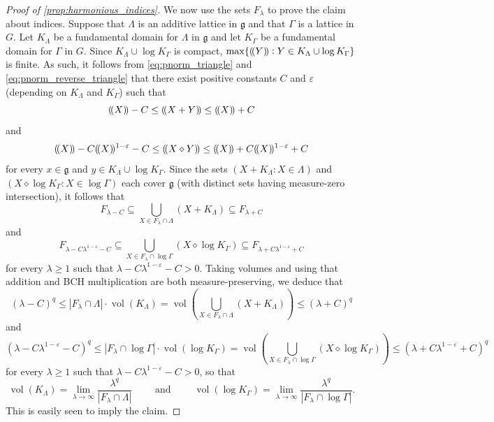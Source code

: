 \documentclass[11pt]{article}
\numberwithin{equation}{section}
\theoremstyle{plain}
\theoremstyle{definition}
\theoremstyle{remark}
\numberwithin{equation}{section}
\newcommand{\eps}{\varepsilon}
\newcommand{\Vol}{\operatorname{vol}}
\numberwithin{equation}{section}
\DeclarePairedDelimiter\pnorm{(\!(}{)\!)}
\begin{document}
\begin{proof}[Proof of \cref{prop:harmonious_indices}]
We now use the sets $F_\lambda$ to prove the claim about indices. Suppose that $\Lambda$ is an additive lattice in $\mathfrak{g}$ and that $\Gamma$ is a lattice in $G$. Let $K_\Lambda$ be a fundamental domain for $\Lambda$ in $\mathfrak{g}$ and let $K_\Gamma$ be a fundamental domain for $\Gamma$ in $G$. 
%
 Since $K_\Lambda \cup \log K_\Gamma$ is compact, $\max\{\pnorm{Y}:Y\in K_\Lambda \cup \log K_\Gamma\}$ is finite. As such, it follows from \eqref{eq:pnorm_triangle} and \eqref{eq:pnorm_reverse_triangle} that there exist positive constants $C$ and $\eps$ (depending on $K_\Lambda$ and $K_\Gamma$) such that
\[
\pnorm{X}-C \leq \pnorm{X+Y} \leq \pnorm{X} + C
 \]
 and
 \[
 \pnorm{X}-C\pnorm{X}^
{1-\eps} -C \leq \pnorm{X 
\diamond Y} \leq \pnorm{X} + C \pnorm{X}^
{1-\eps}+C
\]
for every $x\in \mathfrak{g}$ and $y\in K_\Lambda \cup \log K_\Gamma$. %
Since the sets $(X+K_\Lambda : X \in \Lambda)$ and $(X \diamond \log K_\Gamma : X \in \log \Gamma)$ each cover $\mathfrak{g}$ (with distinct sets having measure-zero intersection), it follows that 
\[
 F_{\lambda - C} \subseteq \bigcup_{X \in F_\lambda \cap \Lambda} (X+K_\Lambda) \subseteq F_{\lambda + C}
%
\]
and
\[
 F_{\lambda-C\lambda^{1-\eps}-C} \subseteq \bigcup_{X \in F_\lambda \cap \log \Gamma} (X \diamond \log K_\Gamma) \subseteq F_{\lambda + C\lambda^{1-\eps}+C}
\]
for every $\lambda \geq 1$ such that $\lambda-C\lambda^{1-\eps}-C>0$. Taking volumes and using that addition and BCH multiplication are both measure-preserving, we deduce that
\begin{equation*}
(\lambda-C)^q \leq |F_\lambda \cap \Lambda| \cdot \Vol (K_\Lambda) = \Vol \left(\bigcup_{X\in F_\lambda \cap \Lambda} (X+K_\Lambda) \right) \leq (\lambda+C)^q
\label{eq:Folner_Lambda_final}
\end{equation*}
and
\begin{equation*}
%
(\lambda - C\lambda^{1-\eps}-C)^q
 \leq |F_\lambda \cap \log \Gamma| \cdot \Vol (\log K_\Gamma) = \Vol \left(\bigcup_{X\in F_\lambda \cap \log \Gamma} (X \diamond \log K_\Gamma) \right)  \leq (\lambda + C\lambda^{1-\eps}+C)^q
\label{eq:Folner_Gamma_final}
\end{equation*}
for every $\lambda \geq 1$ such that $\lambda-C\lambda^{1-\eps}-C>0$, so that
\begin{equation}
\Vol (K_\Lambda) = \lim_{\lambda \to \infty} \frac{\lambda^q}{|F_\lambda \cap \Lambda|} \qquad \text{ and } \qquad \Vol (\log K_\Gamma) = \lim_{\lambda \to \infty} \frac{\lambda^q}{|F_\lambda \cap \log \Gamma|}.
\end{equation}
This is easily seen to imply the claim.
\end{proof}
\end{document}
